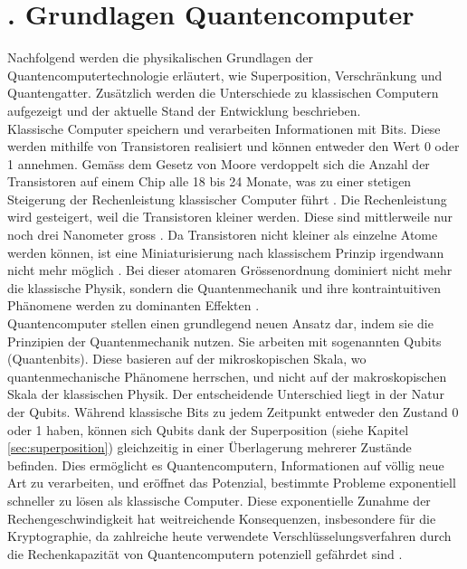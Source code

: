 
\chapter*{\thechapter. Grundlagen Quantencomputer}
Nachfolgend werden die physikalischen Grundlagen der Quantencomputertechnologie erläutert, wie Superposition, Verschränkung und Quantengatter. 
Zusätzlich werden die Unterschiede zu klassischen Computern aufgezeigt und der aktuelle Stand der Entwicklung beschrieben. 
\vspace{1em}\\
Klassische Computer speichern und verarbeiten Informationen mit Bits. Diese werden mithilfe von Transistoren realisiert
und können entweder den Wert 0 oder 1 annehmen. Gemäss dem Gesetz von Moore verdoppelt sich die Anzahl der Transistoren auf einem Chip
alle 18 bis 24 Monate, was zu einer stetigen Steigerung der Rechenleistung klassischer Computer führt \cite{mooreslaw}.
Die Rechenleistung wird gesteigert, weil die Transistoren kleiner werden. Diese sind mittlerweile nur noch drei Nanometer gross \cite{tsmc2022}. 
Da Transistoren nicht kleiner als einzelne Atome werden können, ist eine Miniaturisierung nach klassischem 
Prinzip irgendwann nicht mehr möglich \cite{mooreslaw}. Bei dieser atomaren Grössenordnung dominiert nicht mehr die klassische Physik, 
sondern die Quantenmechanik und ihre kontraintuitiven Phänomene werden zu dominanten Effekten \cite{bashiri2025quantencomputing}.
\\
Quantencomputer stellen einen grundlegend neuen Ansatz dar, indem sie die Prinzipien der 
Quantenmechanik nutzen. 
Sie arbeiten mit sogenannten Qubits (Quantenbits). 
Diese basieren auf der mikroskopischen Skala, 
wo quantenmechanische Phänomene herrschen, und nicht auf der makroskopischen Skala der klassischen Physik. 
Der entscheidende Unterschied liegt in der Natur der Qubits. 
Während klassische Bits zu jedem Zeitpunkt entweder den Zustand 0 oder 1 haben, 
können sich Qubits dank der Superposition (siehe Kapitel \ref{sec:superposition}) gleichzeitig in einer Überlagerung mehrerer Zustände befinden. 
Dies ermöglicht es Quantencomputern, Informationen auf völlig neue Art zu verarbeiten, und eröffnet das Potenzial, 
bestimmte Probleme exponentiell schneller zu lösen als klassische Computer. 
Diese exponentielle Zunahme der Rechengeschwindigkeit hat weitreichende Konsequenzen, insbesondere für die Kryptographie, 
da zahlreiche heute verwendete Verschlüsselungsverfahren durch die Rechenkapazität von Quantencomputern 
potenziell gefährdet sind \cite{bashiri2025quantencomputing}.

